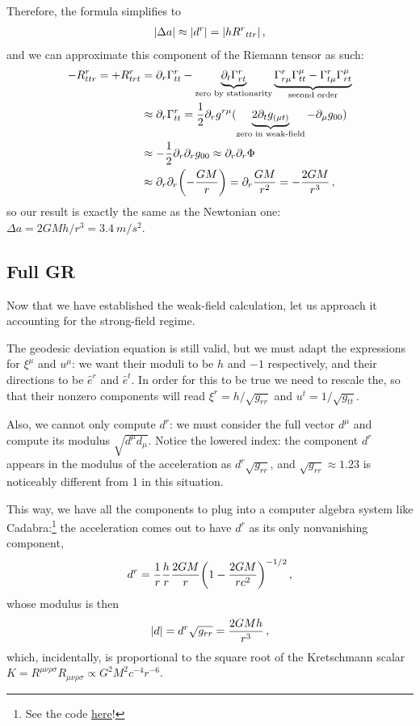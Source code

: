 \documentclass[main.tex]{subfiles}
\begin{document}
Therefore, the formula simplifies to 
%
\begin{align}
\abs{\Delta a} \approx \abs{d^{r}} = \abs{h R^{r}{}_{ttr} }
\,,
\end{align}
%
and we can approximate this component of the Riemann tensor as such: 
%
\begin{align}
-R^{r}_{ttr} =
+R^{r}_{trt} &= \partial_{r} \Gamma^{r}_{tt} - \underbrace{\partial_t \Gamma^{r}_{rt}}_{\text{zero by stationarity}}
\underbrace{\Gamma^{r}_{r \mu } \Gamma^{\mu }_{tt} - \Gamma^{r}_{t \mu } \Gamma^{\mu}_{r t}}_{\text{second order}}  \\
&\approx \partial_{r} \Gamma^{r}_{tt} = \frac{1}{2} \partial_{r} g^{r \mu } (\underbrace{2\partial_{t} g_{(\mu t)}}_{\text{zero in weak-field}}  - \partial_{\mu } g_{00})  \\
&\approx - \frac{1}{2} \partial_{r} \partial_{r} g_{00} 
\approx \partial_{r} \partial_{r} \Phi  \\
&\approx \partial_{r} \partial_{r} \qty(- \frac{GM}{r}) = \partial_{r} \frac{GM}{r^2} = - \frac{2GM}{r^3}
\,,
\end{align}
%
so our result is exactly the same as the Newtonian one: \(\Delta a = 2GM h / r^3 = \SI{3.4}{m / s^2}\). 

\subsection{Full GR}

Now that we have established the weak-field calculation, let us approach it accounting for the strong-field regime. 

The geodesic deviation equation is still valid, but we must adapt the expressions for \(\xi^{\mu }\) and \(u^{\mu }\): 
we want their moduli to be \(h\) and \(-1\) respectively, and their directions to be \(\hat{e}^{r} \) and \(\hat{e}^{t}\).
In order for this to be true we need to rescale the, so that their nonzero components will read \(\xi^{r} = h / \sqrt{g_{rr}}\) and \(u^{t} = 1/\sqrt{g_{tt}}\). 

Also, we cannot only compute \(d^{r}\): we must consider the full vector \(d^{\mu }\) and compute its modulus \(\sqrt{d^{\mu } d_\mu }\). 
Notice the lowered index: the component \(d^{r}\) appears in the modulus of the acceleration as \(d^{r} \sqrt{g_{rr}}\), and \(\sqrt{g_{rr}} \approx \num{1.23}\) is noticeably different from 1 in this situation. 

This way, we have all the components to plug into a computer algebra system like Cadabra:\footnote{See the code \href{https://jacopok.github.io/schwarzschild.html}{here}!}
the acceleration comes out to have \(d^{r}\) as its only nonvanishing component, 
%
\begin{align}
d^{r} = \frac{1}{r} \frac{h}{r} \frac{2GM}{r} \qty(1 - \frac{2GM}{rc^2})^{-1/2}
\,,
\end{align}
%
whose modulus is then 
%
\begin{align}
\abs{d} = d^{r} \sqrt{g_{rr}} = \frac{2GMh}{r^3} 
\,,
\end{align}
%
which, incidentally, is proportional to the square root of the Kretschmann scalar \(K = R^{\mu \nu \rho \sigma } R_{\mu \nu \rho \sigma } \propto G^2M^2c^{-4} r^{-6}\). 
\end{document}
